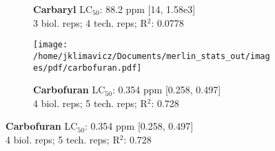 \documentclass{article}
\begin{document}
\begin{figure}[thp!]
\begin{subfigure}{0.500\textwidth}
      \vspace{-0.05cm}
      \caption*{\textbf{Carbaryl} LC$_{50}$: 88.2 ppm [14, 1.58e3] \\ 
3 biol. reps; 4 tech. reps; R$^2$: 0.0778}
      \vspace{0.1cm}
   \end{subfigure}%
   \begin{subfigure}{0.500\textwidth}
      \centering
      \texttt{[image: /home/jklimavicz/Documents/merlin\_stats\_out/images/pdf/carbofuran.pdf]}
      \vspace{-0.05cm}
      \caption*{\textbf{Carbofuran} LC$_{50}$: 0.354 ppm [0.258, 0.497] \\ 
4 biol. reps; 5 tech. reps; R$^2$: 0.728}
      \vspace{0.1cm}
   \end{subfigure}%
\end{figure}
\clearpage
\pagebreak
\vspace{-0.1cm}
\end{document}
